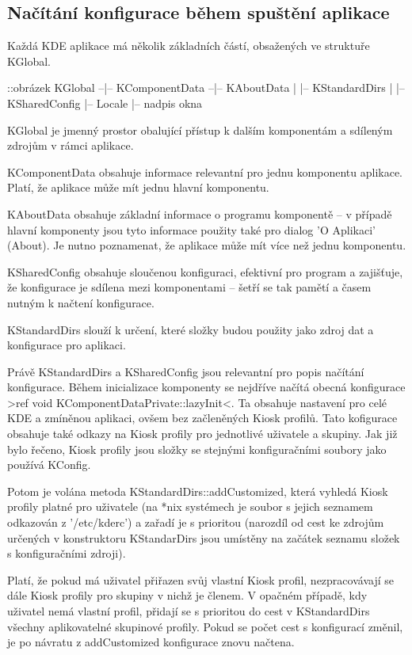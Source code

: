 \subsection{Načítání konfigurace během spuštění aplikace}
Každá KDE aplikace má několik základních částí, obsažených ve struktuře KGlobal.

            ::obrázek
            KGlobal --|-- KComponentData --|-- KAboutData
                      |                    |-- KStandardDirs
                      |                    |-- KSharedConfig
                      |-- Locale
                      |-- nadpis okna

KGlobal je jmenný prostor obalující přístup k dalším komponentám a sdíleným
zdrojům v rámci aplikace.

KComponentData obsahuje informace relevantní pro jednu komponentu aplikace.
Platí, že aplikace může mít jednu hlavní komponentu.

KAboutData obsahuje základní informace o programu komponentě -- v případě hlavní
komponenty jsou tyto informace použity také pro dialog 'O Aplikaci' (About).
Je nutno poznamenat, že aplikace může mít více než jednu komponentu.

KSharedConfig obsahuje sloučenou konfiguraci, efektivní pro program a zajišťuje,
že konfigurace je sdílena mezi komponentami -- šetří se tak pamětí a časem
nutným k načtení konfigurace.

KStandardDirs slouží k určení, které složky budou použity jako zdroj dat
a konfigurace pro aplikaci.

Právě KStandardDirs a KSharedConfig jsou relevantní pro popis načítání
konfigurace. Během inicializace komponenty se nejdříve načítá obecná konfigurace
>ref void KComponentDataPrivate::lazyInit<. Ta obsahuje nastavení pro celé KDE
a zmíněnou aplikaci, ovšem bez začleněných Kiosk profilů. Tato kofigurace
obsahuje také odkazy na Kiosk profily pro jednotlivé uživatele a skupiny. Jak
již bylo řečeno, Kiosk profily jsou složky se stejnými konfiguračními soubory
jako používá KConfig.

Potom je volána metoda KStandardDirs::addCustomized, která vyhledá Kiosk profily
platné pro uživatele (na *nix systémech je soubor s jejich seznamem odkazován z
'/etc/kderc') a zařadí je s prioritou (narozdíl od cest ke zdrojům určených
v konstruktoru KStandarDirs jsou umístěny na začátek seznamu složek
s konfiguračními zdroji).

Platí, že pokud má uživatel přiřazen svůj vlastní Kiosk profil, nezpracovávají
se dále Kiosk profily pro skupiny v nichž je členem. V opačném případě, kdy
uživatel nemá vlastní profil, přidají se s prioritou do cest v KStandardDirs
všechny aplikovatelné skupinové profily. Pokud se počet cest s konfigurací
změnil, je po návratu z addCustomized konfigurace znovu načtena.

